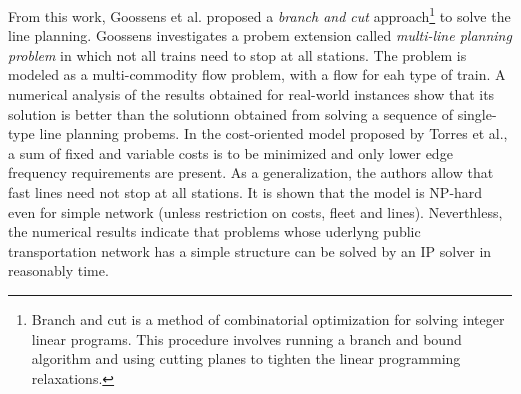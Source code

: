 \documentclass[
  twoside,
  11pt, a4paper,
  footinclude=true,
  headinclude=true,
  cleardoublepage=empty
]{book}
\theoremstyle{definition}
\begin{document}
From this work, Goossens et al.\cite{gooss:book} proposed a \emph{branch and cut} approach\footnote{Branch and cut is a method of combinatorial optimization for solving integer linear programs. This procedure involves running a branch and bound algorithm and using cutting planes to tighten the linear programming relaxations.} to solve the line planning. Goossens investigates a probem extension called \emph{multi-line planning problem} in which not all trains need to stop at all stations. The problem is modeled as a multi-commodity flow problem, with a flow for eah type of train. A numerical analysis of the results obtained for real-world instances show that its solution is better than the solutionn obtained from solving a sequence of single-type line planning probems. \newline
In the cost-oriented model proposed by Torres et al.\cite{torres:art}, a sum of fixed and variable costs is to be minimized and only lower edge frequency requirements are present. As a generalization, the authors allow that fast lines need not stop at all stations. It is shown that the model is NP-hard even for simple network (unless restriction on costs, fleet and lines). Neverthless, the numerical results indicate that problems whose uderlyng public transportation network has a simple structure can be solved by an IP solver in reasonably time.
\end{document}
